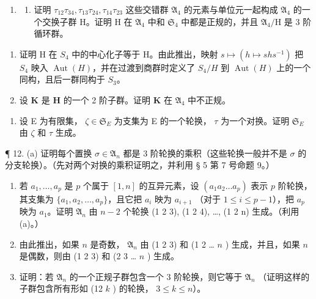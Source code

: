 \begin{enumerate}
\def\labelenumi{\arabic{enumi}。}
\setcounter{enumi}{9}
\tightlist
\item
  \begin{enumerate}
  \def\labelenumii{(\alph{enumii})}
  \tightlist
  \item
    证明 \(\tau_{12}\tau_{34},\tau_{13}\tau_{24},\tau_{14}\tau_{23}\) 这些交错群 \(\mathfrak{A}_4\) 的元素与单位元一起构成 \(\mathfrak{A}_4\) 的一个交换子群 H。证明 H 在 \(\mathfrak{A}_4\) 中和 \(\mathfrak{S}_4\) 中都是正规的，并且 \(\mathfrak{A}_4 / \mathrm{H}\) 是 3 阶循环群。
  \end{enumerate}
\end{enumerate}

\begin{enumerate}
\def\labelenumi{(\alph{enumi})}
\setcounter{enumi}{1}
\item
  证明 H 在 \(S_{4}\) 中的中心化子等于 H。由此推出，映射 \(s \mapsto (h \mapsto shs^{-1})\) 把 \(S_{4}\) 映入 \(\operatorname{Aut}(H)\)，并在过渡到商群时定义了 \(S_{4}/H\) 到 \(\operatorname{Aut}(H)\) 上的一个同构，且后一群同构于 \(S_{3}\)。
\item
  设 \(\mathbf{K}\) 是 \(\mathbf{H}\) 的一个 2 阶子群。证明 \(\mathbf{K}\) 在 \(\mathfrak{A}_4\) 中不正规。
\end{enumerate}

\begin{enumerate}
\def\labelenumi{\arabic{enumi}。}
\setcounter{enumi}{10}
\tightlist
\item
  设 E 为有限集， \(\zeta \in \mathfrak{S}_{E}\) 为支集为 E 的一个轮换， \(\tau\) 为一个对换。证明 \(\mathfrak{S}_{E}\) 由 \(\zeta\) 和 \(\tau\) 生成。
\end{enumerate}

¶ 12. (a) 证明每个置换 \(\sigma \in \mathfrak{A}_n\) 都是 3 阶轮换的乘积（这些轮换一般并不是 \(\sigma\) 的分支轮换）。（先对两个对换的乘积证明之，并利用 § 5 第 7 号命题 9。）

\begin{enumerate}
\def\labelenumi{(\alph{enumi})}
\setcounter{enumi}{1}
\item
  若 \(a_1, \ldots, a_p\) 是 \(p\) 个属于 \([1, n]\) 的互异元素，设 \((a_1 a_2 \ldots a_p)\) 表示 \(p\) 阶轮换，其支集为 \(\{a_1, a_2, \ldots, a_p\}\)，且它把 \(a_i\) 映为 \(a_{i+1}\) （对于 \(1 \leqslant i \leqslant p-1\)），把 \(a_p\) 映为 \(a_1\)。证明 \(\mathfrak{A}_n\) 由 \(n-2\) 个轮换 (1 2 3), (1 2 4), \ldots, (1 2 n) 生成。（利用 (a)。）
\item
  由此推出，如果 \(n\) 是奇数， \(\mathfrak{A}_n\) 由 (1 2 3) 和 (1 2 \ldots{} \(n\) ) 生成，并且，如果 \(n\) 是偶数，则由 (1 2 3) 和 (2 3 \ldots{} \(n\) ) 生成。
\item
  证明：若 \(\mathfrak{A}_n\) 的一个正规子群包含一个 3 阶轮换，则它等于 \(\mathfrak{A}_n\) （证明这样的子群包含所有形如 (12 \(k\) ) 的轮换， \(3 \leqslant k \leqslant n\)）。
\end{enumerate}

